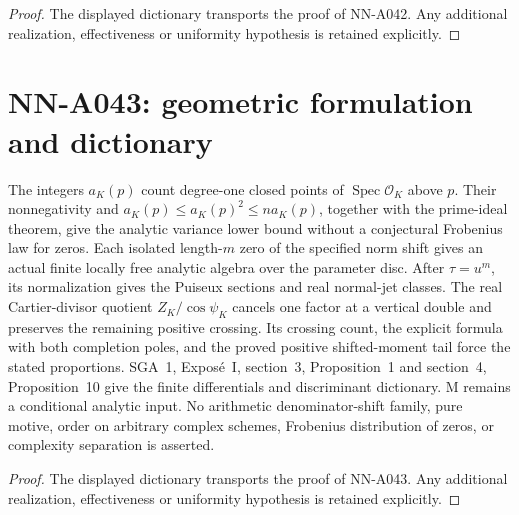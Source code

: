 \begin{proof} The displayed dictionary transports the proof of NN-A042. Any additional realization, effectiveness or uniformity hypothesis is retained explicitly.\end{proof}


\section{NN-A043: geometric formulation and dictionary}
\begin{geometricstatement}[NN-A043]
The integers $a_K(p)$ count degree-one closed points of $\operatorname{Spec}\mathcal O_K$ above $p$. Their nonnegativity and $a_K(p)\le a_K(p)^2\le n a_K(p)$, together with the prime-ideal theorem, give the analytic variance lower bound without a conjectural Frobenius law for zeros. Each isolated length-$m$ zero of the specified norm shift gives an actual finite locally free analytic algebra over the parameter disc. After $\tau=u^m$, its normalization gives the Puiseux sections and real normal-jet classes. The real Cartier-divisor quotient $Z_K/\cos\psi_K$ cancels one factor at a vertical double and preserves the remaining positive crossing. Its crossing count, the explicit formula with both completion poles, and the proved positive shifted-moment tail force the stated proportions. SGA~1, Expos\'e~I, section~3, Proposition~1 and section~4, Proposition~10 give the finite differentials and discriminant dictionary. M remains a conditional analytic input. No arithmetic denominator-shift family, pure motive, order on arbitrary complex schemes, Frobenius distribution of zeros, or complexity separation is asserted.
\end{geometricstatement}
\begin{proof} The displayed dictionary transports the proof of NN-A043. Any additional realization, effectiveness or uniformity hypothesis is retained explicitly.\end{proof}


